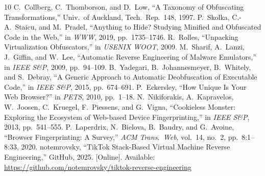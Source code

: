 \documentclass[conference,10pt]{IEEEtran}
\begin{document}
\begin{thebibliography}{10}
 C.~Collberg, C.~Thomborson, and D.~Low, ``A Taxonomy of Obfuscating Transformations,'' Univ.\ of Auckland, Tech.\ Rep.\ 148, 1997.
 P.~Skolka, C.-A.~Staicu, and M.~Pradel, ``Anything to Hide? Studying Minified and Obfuscated Code in the Web,'' in \emph{WWW}, 2019, pp.\ 1735--1746.
 R.~Rolles, ``Unpacking Virtualization Obfuscators,'' in \emph{USENIX WOOT}, 2009.
 M.~Sharif, A.~Lanzi, J.~Giffin, and W.~Lee, ``Automatic Reverse Engineering of Malware Emulators,'' in \emph{IEEE S\&P}, 2009, pp.\ 94--109.
 B.~Yadegari, B.~Johannesmeyer, B.~Whitely, and S.~Debray, ``A Generic Approach to Automatic Deobfuscation of Executable Code,'' in \emph{IEEE S\&P}, 2015, pp.\ 674--691.
 P.~Eckersley, ``How Unique Is Your Web Browser?'' in \emph{PETS}, 2010, pp.\ 1--18.
 N.~Nikiforakis, A.~Kapravelos, W.~Joosen, C.~Kruegel, F.~Piessens, and G.~Vigna, ``Cookieless Monster: Exploring the Ecosystem of Web-based Device Fingerprinting,'' in \emph{IEEE S\&P}, 2013, pp.\ 541--555.
 P.~Laperdrix, N.~Bielova, B.~Baudry, and G.~Avoine, ``Browser Fingerprinting: A Survey,'' \emph{ACM Trans.\ Web}, vol.\ 14, no.\ 2, pp.\ 8:1--8:33, 2020.
 notemrovsky, ``TikTok Stack-Based Virtual Machine Reverse Engineering,'' GitHub, 2025. [Online]. Available: \url{https://github.com/notemrovsky/tiktok-reverse-engineering}
\end{thebibliography}
\end{document}
